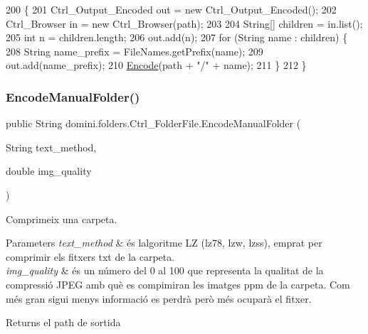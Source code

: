 \begin{DoxyCode}
200                                            \{
201         Ctrl\_Output\_Encoded out = \textcolor{keyword}{new} Ctrl\_Output\_Encoded();
202         Ctrl\_Browser in = \textcolor{keyword}{new} Ctrl\_Browser(path);
203 
204         String[] children = in.list();
205         \textcolor{keywordtype}{int} n = children.length;
206         out.add(n);
207         \textcolor{keywordflow}{for} (String name : children) \{
208             String name\_prefix = FileNames.getPrefix(name);
209             out.add(name\_prefix);
210             \hyperlink{classdomini_1_1folders_1_1Ctrl__FolderFile_a7c47fd5127ae6f713a4fa7f75002a6f6}{Encode}(path + \textcolor{stringliteral}{"/"} + name);
211         \}
212     \}
\end{DoxyCode}
\mbox{\label{classdomini_1_1folders_1_1Ctrl__FolderFile_a8cb5f1a979d5882dd244d69806d5b237}} 
\subsubsection{\texorpdfstring{Encode\+Manual\+Folder()}{EncodeManualFolder()}}
{\footnotesize\ttfamily public String domini.\+folders.\+Ctrl\+\_\+\+Folder\+File.\+Encode\+Manual\+Folder (\begin{DoxyParamCaption}\item[{String}]{text\+\_\+method,  }\item[{double}]{img\+\_\+quality }\end{DoxyParamCaption})\hspace{0.3cm}{\ttfamily [inline]}}



Comprimeix una carpeta. 


\begin{DoxyParams}{Parameters}
{\em text\+\_\+method} & és l\textquotesingle{}algoritme LZ (lz78, lzw, lzss), emprat per comprimir els fitxers txt de la carpeta. \\
\hline
{\em img\+\_\+quality} & és un número del 0 al 100 que representa la qualitat de la compressió J\+P\+EG amb què es compimiran les imatges ppm de la carpeta. Com més gran sigui menys informació es perdrà però més ocuparà el fitxer. \\
\hline
\end{DoxyParams}
\begin{DoxyReturn}{Returns}
el path de sortida 
\end{DoxyReturn}

